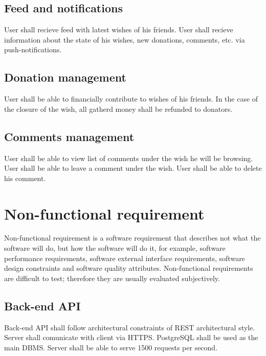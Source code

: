 \subsection*{Feed and notifications}
\begin{itemize}
User shall recieve feed with latest wishes of his friends.
User shall recieve information about the state of his wishes, new donations, comments, etc. via push-notifications.
\end{itemize}

\subsection*{Donation management}
\begin{itemize}
User shall be able to financially contribute to wishes of his friends.
In the case of the closure of the wish, all gatherd money shall be refunded to donators.
\end{itemize}

\subsection*{Comments management}
\begin{itemize}
User shall be able to view list of comments under the wish he will be browsing.
User shall be able to leave a comment under the wish.
User shall be able to delete his comment.
\end{itemize}

\section{Non-functional requirement}
Non-functional requirement is a software requirement that describes not what the software will do, but how the software
will do it, for example, software performance requirements, software external interface requirements, software design
constraints and software quality attributes. Non-functional requirements are difficult to test; therefore they are
usually evaluated subjectively.\cite{nonfuncreq}

\subsection*{Back-end \ac{API}}
\begin{itemize}
Back-end API shall follow architectural constraints of REST architectural style.
Server shall comunicate with client via \ac{HTTPS}.
PostgreSQL shall be used as the main DBMS.
Server shall be able to serve 1500 requests per second.
\end{itemize}

